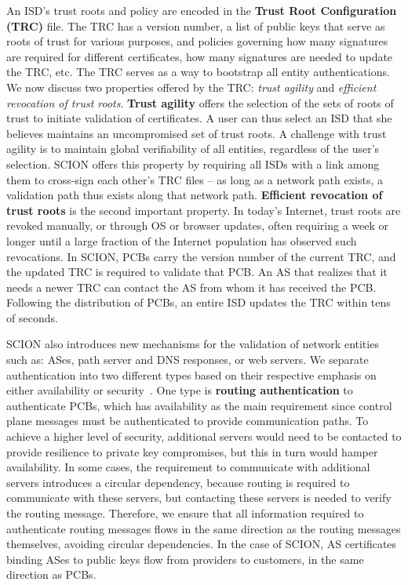 \documentclass[a4paper]{llncs}
\newcommand\SCION{{\small\textsf{SCION}}\xspace}
\begin{document}
An ISD's trust roots and policy are encoded in the \textbf{Trust Root Configuration
(TRC)} file. The TRC has a version number, a list of public keys that serve as
roots of trust for various purposes, and policies governing how many signatures
are required for different certificates, how many signatures are needed to
update the TRC, etc. The TRC serves as a way to bootstrap all entity
authentications. We now discuss two properties offered by the TRC:
\emph{trust agility} and \emph{efficient revocation of trust roots}.
\textbf{Trust agility} offers the selection of the sets of roots of trust to
initiate validation of certificates. A user can thus select an ISD that
she believes maintains an uncompromised set of trust roots. A challenge
with trust agility is to maintain global verifiability of all entities,
regardless of the user's selection. \SCION offers this property by requiring
all ISDs with a link among them to cross-sign each other's TRC files -- as long
as a network path exists, a validation path thus exists along that network path.
\textbf{Efficient revocation of trust roots} is the second important property.
In today's Internet, trust roots are revoked manually, or through OS or browser
updates, often requiring a week or longer until a large fraction of the
Internet population has observed such revocations. In \SCION, PCBs carry the
version number of the current TRC, and the updated TRC is required to validate
that PCB. An AS that realizes that it needs a newer TRC can contact the AS from
whom it has received the PCB. Following the distribution of PCBs, an entire ISD
updates the TRC within tens of seconds.

\SCION also introduces new mechanisms for the validation of network entities
such as: ASes, path server and DNS responses, or web servers. We separate
authentication into two different types based on their respective emphasis on
either availability or security~\cite{MRSKP2015}. One type is \textbf{routing
authentication} to authenticate PCBs, which has availability as the main
requirement since control plane messages must be authenticated to provide
communication paths. To achieve a higher level of security, additional servers
would need to be contacted to provide resilience to private key compromises,
but this in turn would hamper availability. In some cases, the requirement to
communicate with additional servers introduces a circular dependency, because
routing is required to communicate with these servers, but contacting these
servers is needed to verify the routing message. Therefore, we ensure that all
information required to authenticate routing messages flows in the
same direction as the routing messages themselves, avoiding circular
dependencies. In the case of \SCION{}, AS certificates binding ASes to public
keys flow from providers to customers, in the same direction as PCBs.
\end{document}
